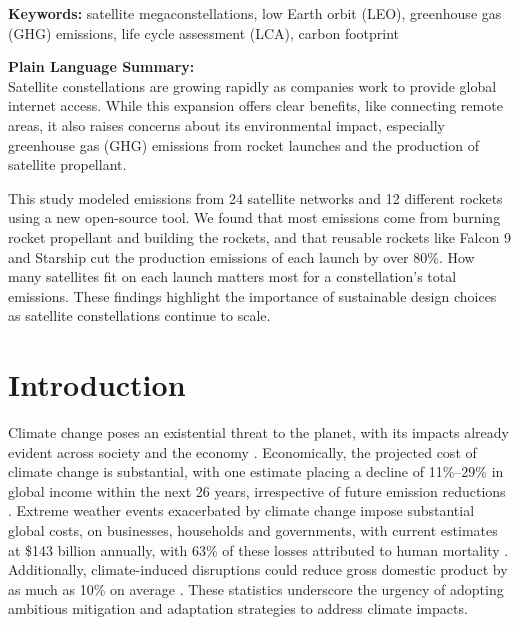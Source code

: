 \documentclass[pdflatex,sn-mathphys-num]{sn-jnl}
\theoremstyle{thmstyleone}%
\theoremstyle{thmstyletwo}%
\theoremstyle{thmstylethree}%
\begin{document}
\vspace{1em}
\noindent\textbf{Keywords:} satellite megaconstellations, low Earth orbit (LEO), greenhouse gas (GHG) emissions, life cycle assessment (LCA), carbon footprint

\vspace{1em}
\noindent\textbf{Plain Language Summary:}\\
Satellite constellations are growing rapidly as companies work to provide global internet access. While this expansion offers clear benefits, like connecting remote areas, it also raises concerns about its environmental impact, especially greenhouse gas (GHG) emissions from rocket launches and the production of satellite propellant.

This study modeled emissions from 24 satellite networks and 12 different rockets using a new open-source tool. We found that most emissions come from burning rocket propellant and building the rockets, and that reusable rockets like Falcon 9 and Starship cut the production emissions of each launch by over 80\%. How many satellites fit on each launch matters most for a constellation's total emissions. These findings highlight the importance of sustainable design choices as satellite constellations continue to scale.

\section{Introduction}\label{sec1}

Climate change poses an existential threat to the planet, with its impacts already evident across society and the economy \citep{huggel_existential_2022, vicedo-cabrera_burden_2021}. Economically, the projected cost of climate change is substantial, with one estimate placing a decline of 11\%–29\% in global income within the next 26 years, irrespective of future emission reductions \citep{kotz_economic_2024}. Extreme weather events exacerbated by climate change impose substantial global costs, on businesses, households and governments, with current estimates at \$143 billion annually, with 63\% of these losses attributed to human mortality \citep{newman_global_2023}. Additionally, climate-induced disruptions could reduce gross domestic product by as much as 10\% on average \citep{waidelich_climate_2024}. These statistics underscore the urgency of adopting ambitious mitigation and adaptation strategies to address climate impacts.
\end{document}
